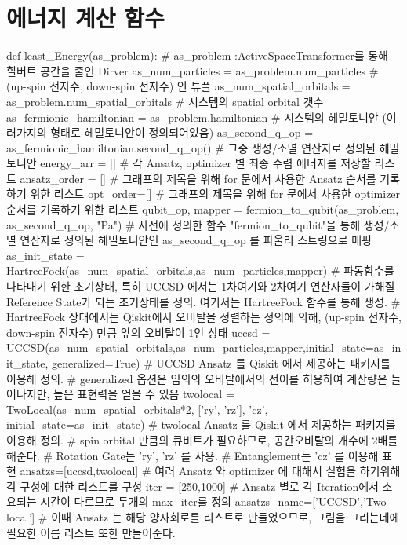 \documentclass[11pt]{article}
\begin{document}
\section{에너지 계산 함수}
\begin{CodeBox}[title={Example: Python snippet}]
def least_Energy(as_problem):
    # as_problem :ActiveSpaceTransformer를 통해 힐버트 공간을 줄인 Dirver
    as_num_particles = as_problem.num_particles
    # (up-spin 전자수, down-spin 전자수) 인 튜플
    as_num_spatial_orbitals = as_problem.num_spatial_orbitals
    # 시스템의 spatial orbital 갯수
    as_fermionic_hamiltonian = as_problem.hamiltonian
    # 시스템의 헤밀토니안 (여러가지의 형태로 헤밀토니안이 정의되어있음)
    as_second_q_op = as_fermionic_hamiltonian.second_q_op()
    # 그중 생성/소멸 연산자로 정의된 헤밀토니안
    energy_arr = [] 
    # 각 Ansatz, optimizer 별 최종 수렴 에너지를 저장할 리스트
    ansatz_order = [] 
    # 그래프의 제목을 위해 for 문에서 사용한 Ansatz 순서를 기록하기 위한 리스트
    opt_order=[]
    # 그래프의 제목을 위해 for 문에서 사용한 optimizer 순서를 기록하기 위한 리스트
    qubit_op, mapper = fermion_to_qubit(as_problem, as_second_q_op, "Pa")
    # 사전에 정의한 함수 "fermion_to_qubit"을 통해 생성/소멸 연산자로 정의된 헤밀토니안인 as_second_q_op 를 파울리 스트링으로 매핑
    as_init_state = HartreeFock(as_num_spatial_orbitals,as_num_particles,mapper)
    # 파동함수를 나타내기 위한 초기상태, 특히 UCCSD 에서는 1차여기와 2차여기 연산자들이 가해질 Reference State가 되는 초기상태를 정의. 여기서는 HartreeFock 함수를 통해 생성.
    # HartreeFock 상태에서는 Qiskit에서 오비탈을 정렬하는 정의에 의해, (up-spin 전자수, down-spin 전자수) 만큼 앞의 오비탈이 1인 상태 
    uccsd = UCCSD(as_num_spatial_orbitals,as_num_particles,mapper,initial_state=as_init_state, generalized=True)
    # UCCSD Ansatz 를 Qiskit 에서 제공하는 패키지를 이용해 정의. 
    # generalized 옵션은 임의의 오비탈에서의 전이를 허용하여 계산량은 늘어나지만, 높은 표현력을 얻을 수 있음 
    twolocal = TwoLocal(as_num_spatial_orbitals*2, ['ry', 'rz'], 'cz', initial_state=as_init_state)
    # twolocal Ansatz 를 Qiskit 에서 제공하는 패키지를 이용해 정의.
    # spin orbital 만큼의 큐비트가 필요하므로, 공간오비탈의 개수에 2배를 해준다. 
    # Rotation Gate는 'ry', 'rz' 를 사용. 
    # Entanglement는 'cz' 를 이용해 표현 
    ansatzs=[uccsd,twolocal]
    # 여러 Ansatz 와 optimizer 에 대해서 실험을 하기위해 각 구성에 대한 리스트를 구성
    iter = [250,1000]
    # Ansatz 별로 각 Iteration에서 소요되는 시간이 다르므로 두개의 max_iter를 정의
    ansatzs_name=['UCCSD','Two local']
    # 이때 Ansatz 는 해당 양자회로를 리스트로 만들었으므로, 그림을 그리는데에 필요한 이름 리스트 또한 만들어준다. 

\end{CodeBox}
\end{document}

